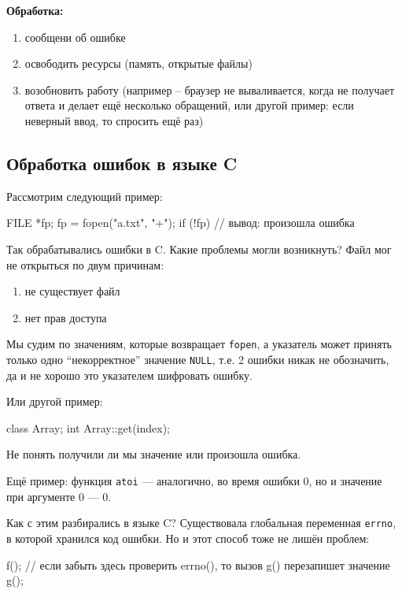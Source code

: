 \textbf{Обработка:}
\begin{enumerate}
	\item сообщени об ошибке
	\item освободить ресурсы (память, открытые файлы)
	\item возобновить работу (например – браузер не вываливается, когда не получает ответа и делает ещё несколько обращений, или другой пример: если неверный ввод, то спросить ещё раз)
\end{enumerate}


\subsection{Обработка ошибок в языке C}
Рассмотрим следующий пример:

\begin{cppcode}
    FILE *fp;
    fp = fopen("a.txt", "+");
    if (!fp) {
         // вывод: произошла ошибка
    }
\end{cppcode}

Так обрабатывались ошибки в C. Какие проблемы могли возникнуть? Файл мог не открыться по двум причинам:
\begin{enumerate}
	\item не существует файл
	\item нет прав доступа
\end{enumerate}

Мы судим по значениям, которые возвращает \texttt{fopen}, а указатель может принять только одно “некорректное” значение \texttt{NULL}, т.е. 2 ошибки никак не обозначить, да и не хорошо это указателем шифровать ошибку.

Или другой пример:

\begin{cppcode}
class Array;
int Array::get(index);
\end{cppcode}

Не понять получили ли мы значение или произошла ошибка.

Ещё пример: функция \texttt{atoi} --- аналогично, во время ошибки 0, но и значение  при аргументе 0 --- 0.

Как с этим разбирались в языке C? Существовала глобальная переменная \texttt{errno}, в которой хранился код ошибки. Но и этот способ тоже не лишён проблем:

\begin{cppcode}
f();
// если забыть здесь проверить errno(), то вызов g() перезапишет значение
g();
\end{cppcode}

